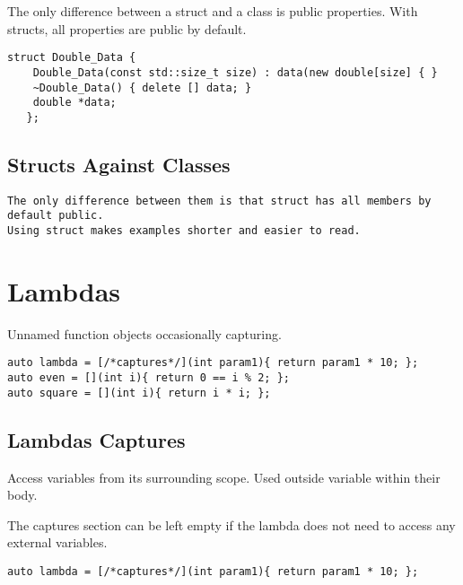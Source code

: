 The only difference between a struct and a class is public properties. With
structs, all properties are public by default.

\begin{verbatim}
struct Double_Data {
    Double_Data(const std::size_t size) : data(new double[size] { }
    ~Double_Data() { delete [] data; }
    double *data;
   };
\end{verbatim}

\subsection{Structs Against Classes}

\begin{verbatim}
The only difference between them is that struct has all members by default public.
Using struct makes examples shorter and easier to read. 
\end{verbatim}

\section{Lambdas}

Unnamed function objects occasionally capturing.

\begin{verbatim}
auto lambda = [/*captures*/](int param1){ return param1 * 10; };
auto even = [](int i){ return 0 == i % 2; };
auto square = [](int i){ return i * i; }; 
\end{verbatim}

\subsection{Lambdas Captures}

Access variables from its surrounding scope.
Used outside variable within their body.

The captures section can be left empty if
the lambda does not need to access any external variables.

\begin{verbatim}
auto lambda = [/*captures*/](int param1){ return param1 * 10; };
\end{verbatim}

